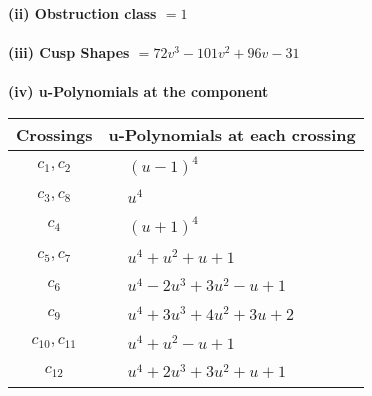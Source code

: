 \documentclass[1p]{elsarticle_modified}
\theoremstyle{definition}
\begin{document}
\flushleft \textbf{(ii) Obstruction class $= 1$}\\~\\
\flushleft \textbf{(iii) Cusp Shapes $= 72 v^3-101 v^2+96 v-31$}\\~\\
\newpage\renewcommand{\arraystretch}{1}
\flushleft \textbf{(iv) u-Polynomials at the component}\newline \\
\begin{tabular}{m{50pt}|m{274pt}}
Crossings & \hspace{64pt}u-Polynomials at each crossing \\
\hline $$\begin{aligned}c_{1},c_{2}\end{aligned}$$&$\begin{aligned}
&(u-1)^4
\end{aligned}$\\
\hline $$\begin{aligned}c_{3},c_{8}\end{aligned}$$&$\begin{aligned}
&u^4
\end{aligned}$\\
\hline $$\begin{aligned}c_{4}\end{aligned}$$&$\begin{aligned}
&(u+1)^4
\end{aligned}$\\
\hline $$\begin{aligned}c_{5},c_{7}\end{aligned}$$&$\begin{aligned}
&u^4+u^2+u+1
\end{aligned}$\\
\hline $$\begin{aligned}c_{6}\end{aligned}$$&$\begin{aligned}
&u^4-2 u^3+3 u^2- u+1
\end{aligned}$\\
\hline $$\begin{aligned}c_{9}\end{aligned}$$&$\begin{aligned}
&u^4+3 u^3+4 u^2+3 u+2
\end{aligned}$\\
\hline $$\begin{aligned}c_{10},c_{11}\end{aligned}$$&$\begin{aligned}
&u^4+u^2- u+1
\end{aligned}$\\
\hline $$\begin{aligned}c_{12}\end{aligned}$$&$\begin{aligned}
&u^4+2 u^3+3 u^2+u+1
\end{aligned}$\\
\hline
\end{tabular}\\~\\
\end{document}
